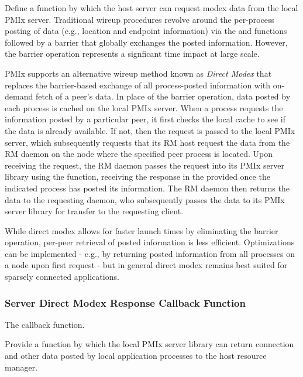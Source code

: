 \descr

Define a function by which the host server can request modex data from the local \ac{PMIx} server. Traditional wireup procedures revolve around the per-process posting of data (e.g., location and endpoint information) via the  and  functions followed by a  barrier that globally exchanges the posted information. However, the barrier operation represents a signficant time impact at large scale.

\ac{PMIx} supports an alternative wireup method known as \textit{Direct Modex} that replaces the barrier-based exchange of all process-posted information with on-demand fetch of a peer's data. In place of the barrier operation, data posted by each process is cached on the local \ac{PMIx} server. When a process requests the information posted by a particular peer, it first checks the local cache to see if the data is already available. If not, then the request is passed to the local \ac{PMIx} server, which subsequently requests that its \ac{RM} host request the data from the \ac{RM} daemon on the node where the specified peer process is located. Upon receiving the request, the \ac{RM} daemon passes the request into its \ac{PMIx} server library using the  function, receiving the response in the provided  once the indicated process has posted its information. The \ac{RM} daemon then returns the data to the requesting daemon, who subsequently passes the data to its \ac{PMIx} server library for transfer to the requesting client.

\adviceuserstart
While direct modex allows for faster launch times by eliminating the barrier operation, per-peer retrieval of posted information is less efficient. Optimizations can be implemented - e.g., by returning posted information from all processes on a node upon first request - but in general direct modex remains best suited for sparsely connected applications.
\adviceuserend

\subsubsection{Server Direct Modex Response Callback Function}

The  callback function.

\summary

Provide a function by which the local \ac{PMIx} server library can return connection and other data posted by local application processes to the host resource manager.

